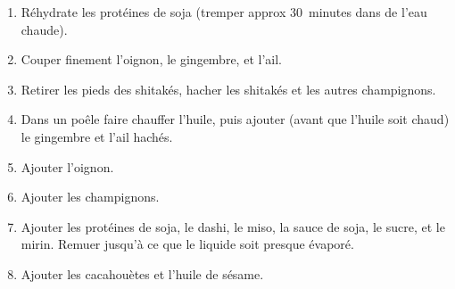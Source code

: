 


\begin{ingredients}
\end{ingredients}


\begin{recipe}
  \begin{enumerate}

  \item Réhydrate les protéines de soja (tremper approx 30~minutes dans de l'eau chaude).

  \item Couper finement l'oignon, le gingembre, et l'ail.

  \item Retirer les pieds des shitakés, hacher les shitakés et les autres champignons.

  \item Dans un poêle faire chauffer l'huile, puis ajouter (avant que
    l'huile soit chaud) le gingembre et l'ail hachés.

  \item Ajouter l'oignon.

  \item Ajouter les champignons.

  \item Ajouter les protéines de soja, le dashi, le miso, la sauce de
    soja, le sucre, et le mirin.  Remuer jusqu'à ce que le liquide
    soit presque évaporé.

  \item Ajouter les cacahouètes et l'huile de sésame.

  \end{enumerate}
\end{recipe}



\begin{ingredients}
\end{ingredients}


